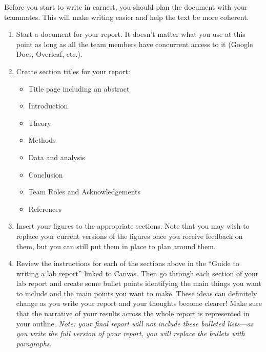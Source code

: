 \documentclass[11pt]{article}
\begin{document}
\vspace{5mm}


\vspace{3mm}

Before you start to write in earnest, you should plan the document with your teammates. This will make writing easier and help the text be more coherent.
\vspace{3mm}

\begin{enumerate}
 \item Start a document for your report. It doesn't matter what you use at this point as long as all the team members have concurrent access to it (Google Docs, Overleaf, etc.).

 \item Create section titles for your report:

  \begin{itemize}
   \item Title page including an abstract
   \item Introduction
   \item Theory
   \item Methods
   \item Data and analysis
   \item Conclusion
   \item Team Roles and Acknowledgements
   \item References
  \end{itemize}

 \item Insert your figures to the appropriate sections. Note that you may wish to replace your current versions of the figures once you receive feedback on them, but you can still put them in place to plan around them.


\item Review the instructions for each of the sections above in the ``Guide to writing a lab report'' linked to Canvas. Then go through each section of your lab report and create some bullet points identifying the main things you want to include and the main points you want to make. These ideas can definitely change as you write your report and your thoughts become clearer! Make sure that the narrative of your results across the whole report is represented in your outline. \textit{Note: your final report will not include these bulleted lists---as you write the full version of your report, you will replace the bullets with paragraphs.}

\end{enumerate}
\end{document}
